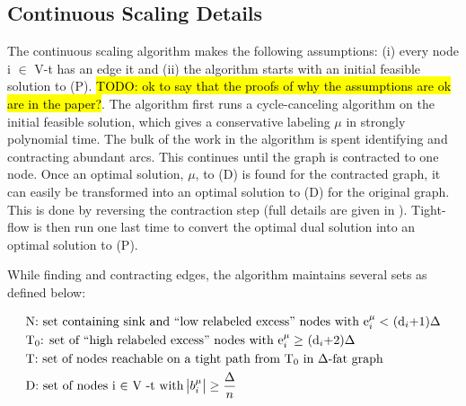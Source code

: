 \documentclass[11pt]{article}
\theoremstyle{definition}
\theoremstyle{definition}
\newcommand{\todo}[1]{\hl{TODO: #1}}
\begin{document}
\subsection{Continuous Scaling Details}
The continuous scaling algorithm makes the following assumptions: (i) every node i $\in$ V-t has an edge it and (ii) the algorithm starts with an initial feasible solution to (P). \todo{ok to say that the proofs of why the assumptions are ok are in the paper?}. The algorithm first runs a cycle-canceling algorithm on the initial feasible solution, which gives a conservative labeling $\mu$ in strongly polynomial time. The bulk of the work in the algorithm is spent identifying and contracting abundant arcs. This continues until the graph is contracted to one node. Once an optimal solution, $\mu$, to (D) is found for the contracted graph, it can easily be transformed into an optimal solution to (D) for the original graph. This is done by reversing the contraction step (full details are given in \cite{article}). Tight-flow is then run one last time to convert the optimal dual solution into an optimal solution to (P).

While finding and contracting edges, the algorithm maintains several sets as defined below:

\begin{align*}
&\text{N: set containing sink and ``low relabeled excess'' nodes with e$_i^\mu <$ (d$_i$+1)$\Delta$} \\
&\text{T$_0$: set of ``high relabeled excess'' nodes with e$_i^\mu \geq$ (d$_i$+2)$\Delta$} \\
&\text{T: set of nodes reachable on a tight path from T$_0$ in $\Delta$-fat graph} \\ 
&\text{D: set of nodes i $\in$ V -t with $\abs{b_i^\mu} \geq \frac{\Delta}{n}$}
\end{align*}
\end{document}
